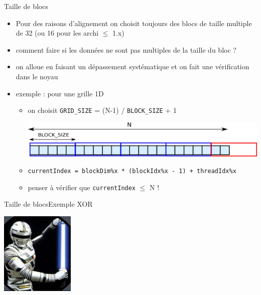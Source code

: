 \documentclass[11pt,mathserif]{beamer}
\newcommand{\scout}{\faAngellist}
\newcommand{\galde}{\faQuestion}
\newcommand{\argi}{\faLightbulbO}
\newcommand{\kontuz}{\faExclamationTriangle}
\newcommand{\egia}{\faCheckCircle}
\newif\ifC
\newcommand{\extcu}{cu}
\newcommand{\extcu}{cuf}
\newcommand{\includeSrcCu}[1]{}
\begin{document}
\begin{frame}{Taille de blocs}
  \begin{itemize}[<+->]
    \item[\scout] Pour des raisons d'alignement on choisit toujours des blocs de taille multiple de 32 (ou 16 pour les archi $\leqslant$ 1.x)
    \item[\galde] comment faire si les données ne sont pas multiples de la taille du bloc ?
    \item[\argi] on alloue en faisant un dépassement systématique et on fait une vérification dans le noyau
    \item exemple : pour une grille 1D
  \begin{itemize}
    \item[\egia] on choisit \texttt{GRID\_SIZE} = (N-1) / \texttt{BLOCK\_SIZE} + 1
\begin{center}
\includegraphics[width=0.7\linewidth]{fig/grille_1D.eps}
\end{center}
\ifC
   \item[\egia] \texttt{\small currentIndex = blockDim.x * blockIdx.x + threadIdx.x}
\else
   \item[\egia] \texttt{\small currentIndex = blockDim\%x * (blockIdx\%x - 1) + threadIdx\%x}
\fi
   \item[\kontuz] penser à vérifier que \texttt{currentIndex} \ifC \lt \else $\leq$ \fi N !
 \end{itemize}
  \end{itemize}
\end{frame}

\begin{frame}{Taille de blocs}{Exemple XOR}
\begin{flushright}
\includegraphics[width=0.1\linewidth]{fig/xor.jpg}
\end{flushright}
  \includeSrcCu{code/overflow}
\end{frame}
\end{document}
